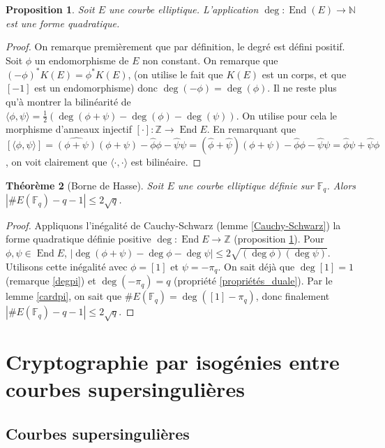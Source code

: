 \documentclass{article}
\theoremstyle{plain}%
\newtheorem{thm}{Théorème}[section]
\newtheorem{prop}[thm]{Proposition}
\theoremstyle{definition}%
\newcommand{\F}{\mathbb{F}}
\newcommand{\Z}{\mathbb{Z}}
\newcommand{\h}{\widehat}
\DeclareMathOperator{\End}{End}
\begin{document}
\begin{prop}
  \label{degré_quadratique}
  Soit $E$ une courbe elliptique. L'application $\deg : \End(E) \to \mathbb N$ est une forme quadratique.
\end{prop}

\begin{proof}
  On remarque premièrement que par définition, le degré est défini positif. Soit $\phi$ un endomorphisme de $E$ non constant. On remarque que $(-\phi)^*K(E) = \phi^*K(E)$, (on utilise le fait que $K(E)$ est un corps, et que $[-1]$ est un endomorphisme) donc $\deg(-\phi) = \deg(\phi)$. Il ne reste plus qu'à montrer la bilinéarité de $\langle \phi, \psi\rangle = \frac{1}{2}(\deg(\phi+\psi) - \deg(\phi) -\deg(\psi))$. On utilise pour cela le morphisme d'anneaux injectif $[\cdot] :\Z\to \End E$. En remarquant que $[\langle \phi, \psi\rangle] = \h{(\phi + \psi)}(\phi + \psi) - \h\phi\phi -\h\psi\psi =  (\h\phi + \h\psi)(\phi + \psi) - \h\phi\phi -\h\psi\psi = \h\phi\psi + \h\psi\phi$, on voit clairement que $\langle\cdot,\cdot\rangle$ est bilinéaire.
\end{proof}

\begin{thm}[Borne de Hasse]
  \label{hasse}
  Soit $E$ une courbe elliptique définie sur $\F_q$. Alors $|\#E(\F_q) - q -1|\le 2\sqrt{q}$.
\end{thm}

\begin{proof}
  Appliquons l'inégalité de Cauchy-Schwarz (lemme \ref{Cauchy-Schwarz})  la forme quadratique définie positive $\deg : \End E \to \Z$ (proposition \ref{degré_quadratique}). Pour $\phi, \psi\in \End E$, $|\deg(\phi+\psi) - \deg\phi -\deg\psi| \le 2\sqrt{(\deg\phi)(\deg\psi)}$. Utilisons cette inégalité avec $\phi = [1]$ et $\psi = -\pi_q$. On sait déjà que $\deg[1] = 1$ (remarque \ref{degpi}) et $\deg(-\pi_q) = q$ (propriété \ref{propriétés_duale}). 
  Par le lemme \ref{cardpi}, on sait que $\#E(\F_q) = \deg([1] - \pi_q)$, donc finalement $|\#E(\F_q)-q-1| \le 2\sqrt{q}$.
\end{proof}

\section{Cryptographie par isogénies entre courbes supersingulières}



\subsection{Courbes supersingulières}
\end{document}
